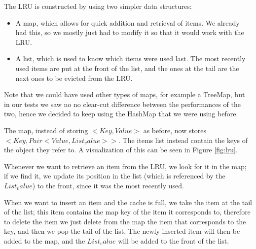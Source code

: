 The LRU is constructed by using two simpler data structures:
\begin{itemize}  
  \item A map, which allows for quick addition and retrieval of items. We already had this, so we mostly just had to modify it so that it would work with the LRU.
  \item A list, which is used to know which items were used last. The most recently used items are put at the front of the list, and the ones at the tail are the next ones to be evicted from the LRU.
\end{itemize}

Note that we could have used other types of maps, for example a TreeMap, but in our tests we saw no no clear-cut difference between the performances of the two, hence we decided to keep using the HashMap that we were using before.

The map, instead of storing $<Key, Value>$ as before, now stores $<Key, Pair<Value, List_value>>$. The items list instead contain the keys of the object they refer to. A visualization of this can be seen in Figure \ref{fig:lru}.

Whenever we want to retrieve an item from the LRU, we look for it in the map; if we find it, we update its position in the list (which is referenced by the $List_value$) to the front, since it was the most recently used.

When we want to insert an item and the cache is full, we take the item at the tail of the list; this item contains the map key of the item it corresponds to, therefore to delete the item we just delete from the map the item that corresponds to the key, and then we pop the tail of the list. 
The newly inserted item will then be added to the map, and the $List_value$ will be added to the front of the list.


